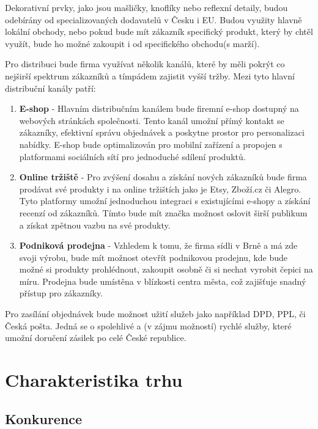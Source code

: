 \documentclass[12pt, a4paper]{article}
\begin{document}
Dekorativní prvky, jako jsou mašličky, knoflíky nebo reflexní detaily, budou odebírány od specializovaných dodavatelů v Česku i EU.
Budou využity hlavně lokální obchody, nebo pokud bude mít zákazník specifický produkt, který by chtěl využít,
bude ho možné zakoupit i od specifického obchodu(s marží).

\vspace{20pt}
\noindent Pro distribuci bude firma využívat několik kanálů, které by měli pokrýt co nejširší spektrum zákazníků a tímpádem
zajistit vyšší tržby. Mezi tyto hlavní distribuční kanály patří:

\begin{enumerate}
  \item \textbf{E-shop} -
  Hlavním distribučním kanálem bude firemní e-shop dostupný na webových stránkách společnosti. 
  Tento kanál umožní přímý kontakt se zákazníky, efektivní správu objednávek a poskytne prostor pro personalizaci nabídky. 
  E-shop bude optimalizován pro mobilní zařízení a propojen s platformami sociálních sítí pro jednoduché sdílení produktů.
  \item \textbf{Online tržiště} -
  Pro zvýšení dosahu a získání nových zákazníků bude firma prodávat své produkty i na online tržištích jako je Etsy, Zboží.cz či Alegro.
  Tyto platformy umožní jednoduchou integraci s existujícími e-shopy a získání recenzí od zákazníků.
  Tímto bude mít značka možnost oslovit širší publikum a získat zpětnou vazbu na své produkty.
  \item \textbf{Podniková prodejna} -
  Vzhledem k tomu, že firma sídli v Brně a má zde svoji výrobu, bude mít možnost otevřít podnikovou prodejnu, kde bude možné si produkty prohlédnout, zakoupit osobně
  či si nechat vyrobit čepici na míru. Prodejna bude umístěna v blízkosti centra města, což zajišťuje snadný přístup pro zákazníky.
\end{enumerate}

Pro zasílání objednávek bude možnost užití služeb jako například DPD, PPL, či Česká pošta.
Jedná se o spolehlivé a (v zájmu možností) rychlé služby, které umožní doručení zásilek po celé České republice.

\pagebreak

\section{Charakteristika trhu}
\subsection{Konkurence}
\end{document}
